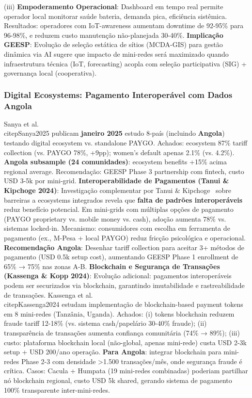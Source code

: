 \documentclass[12pt, a4paper]{article}
\begin{document}
(iii)
\textbf{Empoderamento Operacional}: Dashboard em tempo real permite operador local monitorar saúde bateria, demanda pica, eficiência sistêmica. Resultados: operadores com IoT-awareness aumentam downtime de 92-95\% para 96-98\%, e reduzem custo manutenção não-planejada 30-40\%.
\textbf{Implicação GEESP}: Evolução de seleção estática de sítios (MCDA-GIS) para gestão dinâmica via AI sugere que impacto de mini-redes será maximizado quando infraestrutura técnica (IoT, forecasting) acopla com seleção participativa (SIG) + governança local (cooperativa).

\subsubsection{Digital Ecosystems: Pagamento Interoperável com Dados Angola}

Sanya et al.~\\citep{Sanya2025} publicam
\textbf{janeiro 2025} estudo 8-país (incluindo
\textbf{Angola}) testando digital ecosystem vs. standalone PAYGO. Achados: ecosystem 87\% tariff collection (vs. PAYGO 78\%, +9pp); women's default apenas 2.1\% (vs. 4.2\%).
\textbf{Angola subsample (24 comunidades)}: ecosystem benefits +15\% acima regional average. Recomendação: GEESP Phase 3 partnership com fintech, custo USD 3-5k por mini-grid.
\textbf{Interoperabilidade de Pagamentos (Tanui \& Kipchoge 2024)}: Investigação complementar por Tanui \& Kipchoge~\citep{Tanui2024} sobre barreiras a ecosystems integrados revela que
\textbf{falta de padrões interoperáveis} reduz benefício potencial. Em mini-grids com múltiplas opções de pagamento (PAYGO proprietary vs. mobile money vs. cash), adoção aumenta 78\% vs. sistemas locked-in. Mecanismo: consumidores com escolha em ferramenta de pagamento (ex., M-Pesa + local PAYGO) reduz fricção psicológica e operacional.
\textbf{Recomendação Angola}: Desenhar tariff collection para aceitar 3+ métodos de pagamento (USD 0.5k setup cost), aumentando GEESP Phase 1 enrollment de 65\% → 75\% nas zonas A-B.
\textbf{Blockchain e Segurança de Transações (Kassenga \& Kopp 2024)}: Evolução adicional: pagamentos interoperáveis podem ser securizados via blockchain, garantindo imutabilidade e rastreabilidade de transações. Kassenga et al.~\\citep{Kassenga2024} estudam implementação de blockchain-based payment tokens em 8 mini-redes (Tanzânia, Uganda). Achados: (i) tokens blockchain reduzem fraude tariff 12-18\% (vs. sistema cash/papelário 30-40\% fraude); (ii) transparência de transações aumenta confiança comunitária (74\% → 89\%); (iii) custo: plataforma blockchain local (não-global, apenas mini-rede) custa USD 2-3k setup + USD 200/ano operação.
\textbf{Para Angola}: integrar blockchain para mini-redes Phase 2-3 com densidade >1.500 transações/mês, onde segurança fraude é crítica. Casos: Cacula + Humpata (19 mini-redes combinadas) poderiam partilhar nó blockchain regional, custo USD 5k shared, gerando sistema de pagamento 100\% transparente inter-mini-redes.
\end{document}

